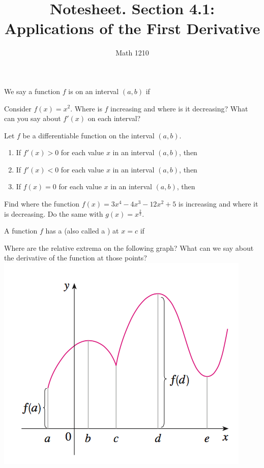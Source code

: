 \documentclass[12pt, a4paper]{article}
\author{Math 1210}
\title{Notesheet. Section 4.1: \\ Applications of the First Derivative}
\date{}
\begin{document}
\maketitle
\nameline
\begin{defi}
  We say a function \(f\) is  on an interval \((a,b)\)
  if
\end{defi}
\begin{ex}
  Consider \(f(x) = x^2\). Where is \(f\) increasing and where is it
  decreasing? What can you say about \(f'(x)\) on each interval?
\end{ex}
\begin{thrm} Let \(f\) be a differentiable function on the interval \((a,b)\).
  \begin{enumerate}
  \item If \(f'(x) > 0\) for each value \(x\) in an interval
    \((a,b)\), then
  \item If \(f'(x) < 0\) for each value \(x\) in an interval
    \((a,b)\), then
  \item If \(f(x) = 0\) for each value \(x\) in an interval \((a,b)\),
    then
  \end{enumerate}
\end{thrm}
\begin{ex}
  Find where the function \(f(x) = 3x^4 - 4x^3 - 12x^2 + 5\) is
  increasing and where it is decreasing. Do the same with \(g(x) =
  x^\frac{2}{3}\).
\end{ex}
\begin{defi}
  A function \(f\) has a  (also called a
  ) at \(x=c\) if
\end{defi}
\begin{ex}
  Where are the relative extrema on the following graph? What can we
  say about the derivative of the function at those points?\\
  \includegraphics[scale=0.5]{images/graph-with-extrema}
\end{ex}
\end{document}
